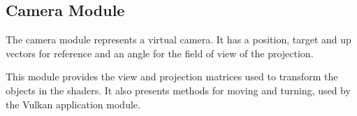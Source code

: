 \subsection{Camera Module}
The camera module represents a virtual camera. It has a position, target and up vectors for reference and an angle for the field of view of the projection.

This module provides the view and projection matrices used to transform the objects in the shaders. It also presents methods for moving and turning, used by the Vulkan application module.
